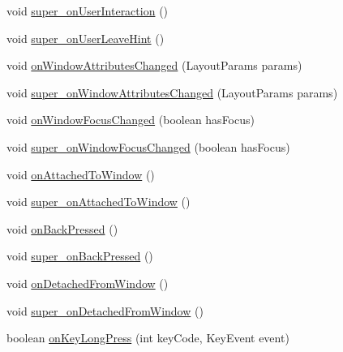 \begin{DoxyCompactItemize}
void \hyperlink{classorg_1_1qtproject_1_1qt5_1_1android_1_1bindings_1_1_qt_activity_a706d78309b31669959a98b46952de75c}{super\-\_\-on\-User\-Interaction} ()
\item 
void \hyperlink{classorg_1_1qtproject_1_1qt5_1_1android_1_1bindings_1_1_qt_activity_ae71ad183d13c1bbb1fd1dccee12dde24}{super\-\_\-on\-User\-Leave\-Hint} ()
\item 
void \hyperlink{classorg_1_1qtproject_1_1qt5_1_1android_1_1bindings_1_1_qt_activity_af881fa829fb552af632f8b1bba96f351}{on\-Window\-Attributes\-Changed} (Layout\-Params params)
\item 
void \hyperlink{classorg_1_1qtproject_1_1qt5_1_1android_1_1bindings_1_1_qt_activity_aa510558df5227f66d81d6119389e7886}{super\-\_\-on\-Window\-Attributes\-Changed} (Layout\-Params params)
\item 
void \hyperlink{classorg_1_1qtproject_1_1qt5_1_1android_1_1bindings_1_1_qt_activity_ab161d356ebf5044a00182ffaf79d3437}{on\-Window\-Focus\-Changed} (boolean has\-Focus)
\item 
void \hyperlink{classorg_1_1qtproject_1_1qt5_1_1android_1_1bindings_1_1_qt_activity_a3d01ed848c426f937fe18214ff006931}{super\-\_\-on\-Window\-Focus\-Changed} (boolean has\-Focus)
\item 
void \hyperlink{classorg_1_1qtproject_1_1qt5_1_1android_1_1bindings_1_1_qt_activity_a052fd4aee0de52bcf2d8a10c5671d586}{on\-Attached\-To\-Window} ()
\item 
void \hyperlink{classorg_1_1qtproject_1_1qt5_1_1android_1_1bindings_1_1_qt_activity_a7155f32de8ac1f383e18250f28cd1f97}{super\-\_\-on\-Attached\-To\-Window} ()
\item 
void \hyperlink{classorg_1_1qtproject_1_1qt5_1_1android_1_1bindings_1_1_qt_activity_a593eeb49762865051c6348a6b98e7ff1}{on\-Back\-Pressed} ()
\item 
void \hyperlink{classorg_1_1qtproject_1_1qt5_1_1android_1_1bindings_1_1_qt_activity_a84b318d75dea61b3aa2743fb475c90da}{super\-\_\-on\-Back\-Pressed} ()
\item 
void \hyperlink{classorg_1_1qtproject_1_1qt5_1_1android_1_1bindings_1_1_qt_activity_aa7cad0cee8c325c1cbd7bb77a8a2c5ce}{on\-Detached\-From\-Window} ()
\item 
void \hyperlink{classorg_1_1qtproject_1_1qt5_1_1android_1_1bindings_1_1_qt_activity_a103cd6d406de520a7c30fa31a704ee11}{super\-\_\-on\-Detached\-From\-Window} ()
\item 
boolean \hyperlink{classorg_1_1qtproject_1_1qt5_1_1android_1_1bindings_1_1_qt_activity_ad1c024d3096ee30566b083bf35b711f4}{on\-Key\-Long\-Press} (int key\-Code, Key\-Event event)

\end{DoxyCompactItemize}
